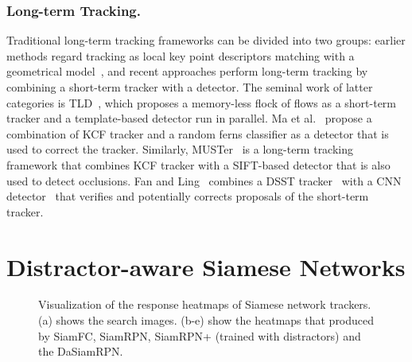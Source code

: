 \documentclass[runningheads]{llncs}
\begin{document}
\subsubsection{Long-term Tracking.}
Traditional long-term tracking frameworks can be divided into two groups: earlier methods regard tracking as local key point descriptors matching with a geometrical model~\cite{pernici2014object,nebehay2015clustering,maresca2013matrioska}, and recent approaches perform long-term tracking by combining a short-term tracker with a detector.
The seminal work of latter categories is TLD~\cite{TLD}, which proposes a memory-less flock of flows as a short-term tracker and a template-based detector run in parallel. Ma et al. ~\cite{LCT}propose a combination of KCF tracker and a random ferns classifier as a detector that is used to correct the tracker. Similarly, MUSTer~\cite{muster} is a long-term tracking framework that combines KCF tracker with a SIFT-based detector that is also used to detect occlusions. Fan and Ling~\cite{PTAV} combines a DSST tracker~\cite{DSST} with a CNN detector~\cite{SINT} that verifies and potentially corrects proposals of the short-term tracker.






\section{Distractor-aware Siamese Networks}




\begin{figure}[t]
\centering
{}\caption{Visualization of the response heatmaps of Siamese network trackers. (a) shows the search images. (b-e) show the heatmaps that produced by SiamFC, SiamRPN, SiamRPN+ (trained with distractors) and the DaSiamRPN.
}
\label{fig:visual}
\end{figure}
\end{document}
